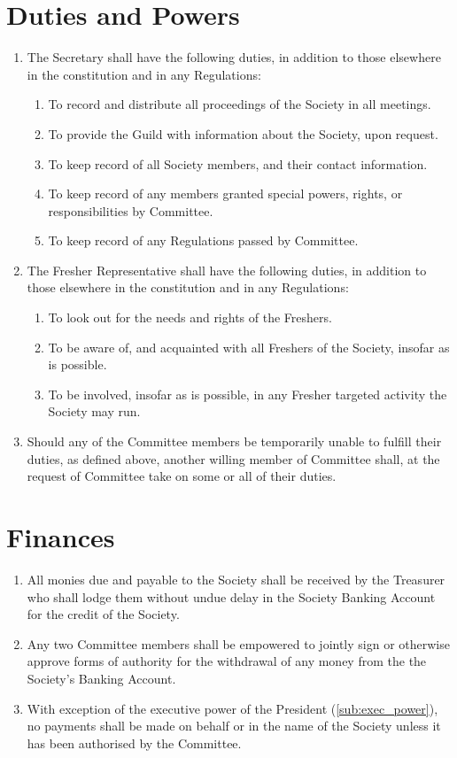 \documentclass[a4paper]{article}
\newenvironment{enumsection}[1]{\section{#1} \begin{enumerate}[ref=\thesection.\theenumi]}{\end{enumerate}}
\begin{document}
\begin{enumsection}{Duties and Powers}
    \item The Secretary shall have the following duties, in addition to those elsewhere in the constitution and in any Regulations:
    \begin{enumerate}
        \item To record and distribute all proceedings of the Society in all meetings.
        \item To provide the Guild with information about the Society, upon request.
        \item To keep record of all Society members, and their contact information.
        \item To keep record of any members granted special powers, rights, or responsibilities by Committee.
        \item To keep record of any Regulations passed by Committee.
    \end{enumerate}
    
    \item The Fresher Representative shall have the following duties, in addition to those elsewhere in the constitution and in any Regulations:
    \begin{enumerate}
        \item To look out for the needs and rights of the Freshers.
        \item To be aware of, and acquainted with all Freshers of the Society, insofar as is possible.
        \item To be involved, insofar as is possible, in any Fresher targeted activity the Society may run.
    \end{enumerate}
    
    \item Should any of the Committee members be temporarily unable to fulfill their duties, as defined above, another willing member of Committee shall, at the request of Committee take on some or all of their duties.
\end{enumsection}


\begin{enumsection}{Finances} \label{sec:finances}
    \item All monies due and payable to the Society shall be received by the Treasurer who shall lodge them without undue delay in the Society Banking Account for the credit of the Society.
    \item Any two Committee members shall be empowered to jointly sign or otherwise approve forms of authority for the withdrawal of any money from the the Society's Banking Account.
    \item With exception of the executive power of the President (\cref{sub:exec_power}), no payments shall be made on behalf or in the name of the Society unless it has been authorised by the Committee.
\end{enumsection}
\end{document}
